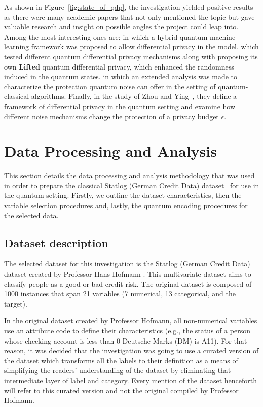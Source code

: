 \documentclass{ieeeaccess}
\begin{document}
As shown in Figure~\ref{fig:state_of_qdp}, the investigation yielded positive results as there were many academic papers that not only mentioned the topic but gave valuable research and insight on possible angles the project could leap into. Among the most interesting ones are: \cite{watkins2023quantum} in which a hybrid quantum machine learning framework was proposed to allow differential privacy in the model. \cite{song2025hybrid} which tested different quantum differential privacy mechanisms along with proposing its own \textbf{Lifted} quantum differential privacy, which enhanced the randomness induced in the quantum states. \cite{yang2023improved} in which an extended analysis was made to characterize the protection quantum noise can offer in the setting of quantum-classical algorithms. Finally, in the study of Zhou and Ying~\cite{zhou2017differential}, they define a framework of differential privacy in the quantum setting and examine how different noise mechanisms change the protection of a privacy budget $\epsilon$.

\section{Data Processing and Analysis}
\label{sec:data_processing_and_analysis}

This section details the data processing and analysis methodology that was used in order to prepare the classical Statlog (German Credit Data) dataset~\cite{hofmann1994german, germancredit2026} for use in the quantum setting. Firstly, we outline the dataset characteristics, then the variable selection procedures and, lastly, the quantum encoding procedures for the selected data. 

\subsection{Dataset description}

The selected dataset for this investigation is the Statlog (German Credit Data) dataset created by Professor Hans Hofmann \cite{hofmann1994german}. This multivariate dataset aims to classify people as a good or bad credit risk. The original dataset is composed of 1000 instances that span 21 variables (7 numerical, 13 categorical, and the target). 

In the original dataset created by Professor Hofmann, all non-numerical variables use an attribute code to define their characteristics (e.g., the status of a person whose checking account is less than 0 Deutsche Marks (DM) is A11). For that reason, it was decided that the investigation was going to use a curated version of the dataset \cite{germancredit2026} which transforms all the labels to their definition as a means of simplifying the readers' understanding of the dataset by eliminating that intermediate layer of label and category. Every mention of the dataset henceforth will refer to this curated version and not the original compiled by Professor Hofmann.
\end{document}
